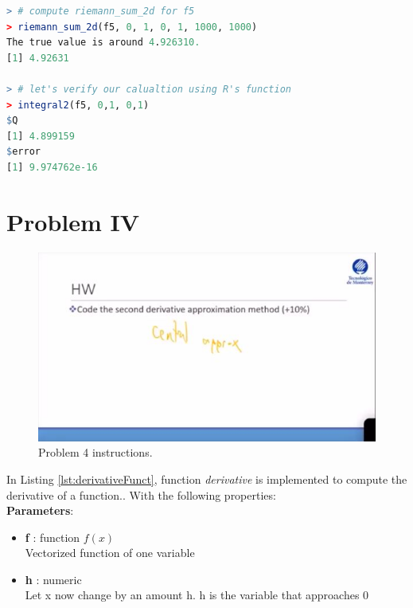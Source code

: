 \documentclass[11pt,a4paper]{article}
\begin{document}
\clearpage

\begin{lstlisting}[frame=trBL, language=R, caption="Listing \ref{lst:rriemann2DFunct5} output"
\label{lst:rriemann2DFunct5_out}]
> # compute riemann_sum_2d for f5
> riemann_sum_2d(f5, 0, 1, 0, 1, 1000, 1000)
The true value is around 4.926310.
[1] 4.92631

> # let's verify our calualtion using R's function
> integral2(f5, 0,1, 0,1)
$Q
[1] 4.899159
$error
[1] 9.974762e-16
\end{lstlisting}

\clearpage

\section{Problem IV}\label{sec:p4}

\begin{figure}[!h]
\centering
\includegraphics[width=\textwidth]{./img/instructionsP4.jpg}
\caption{Problem 4 instructions.\label{fig:P4inst}}
\end{figure}

In Listing \ref{lst:derivativeFunct}, function \emph{derivative} is implemented to compute the derivative of a function.. With the following properties:\\
  
\textbf{Parameters}:
\begin{itemize}
  \item {\textbf{f} : function $ f(x) $\\
Vectorized function of one variable}
  \item {\textbf{h} : numeric\\
Let x now change by an amount h. h is the variable that approaches 0}
\end{itemize}
\end{document}
